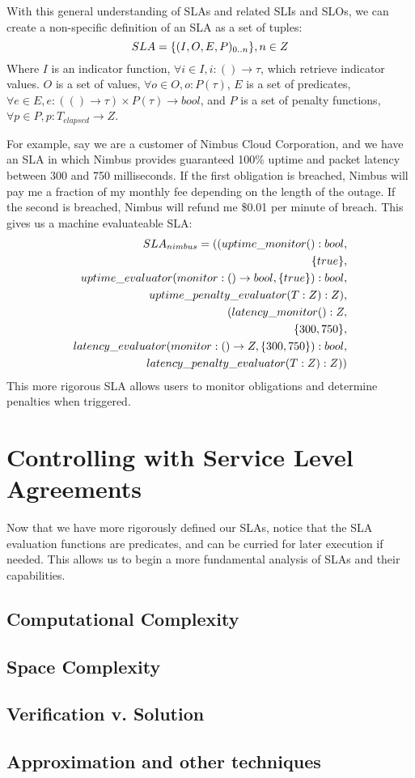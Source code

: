With this general understanding of SLAs and related SLIs and SLOs, we can create a non-specific definition of an SLA as a set of tuples:
\begin{equation}
SLA = \lbrace (I,O,E,P)_{0..n} \rbrace, n \in Z \\
\end{equation}
Where $ I $ is an indicator function, $ \forall i \in I, i : () \rightarrow \tau $, which retrieve indicator values.  $ O $ is a set of values, $ \forall o \in O, o : P(\tau) $, $ E $ is a set of predicates, $ \forall e \in E, e : ( () \rightarrow \tau ) \times P(\tau) \rightarrow bool $, and $ P $ is a set of penalty functions, $ \forall p \in P, p : T_{elapsed} \rightarrow Z $.

For example, say we are a customer of Nimbus Cloud Corporation, and we have an SLA in which Nimbus provides guaranteed 100\% uptime and packet latency between 300 and 750 milliseconds.  If the first obligation is breached, Nimbus will pay me a fraction of my monthly fee depending on the length of the outage.  If the second is breached, Nimbus will refund me \$0.01 per minute of breach.  This gives us a machine evaluateable SLA:
\begin{align}
SLA_{nimbus} = ( ( uptime\_monitor() : bool, \\
\lbrace true \rbrace, \notag \\
uptime\_evaluator( monitor : () \rightarrow bool, \lbrace true \rbrace) : bool, \notag \\
uptime\_penalty\_evaluator( T : Z ) : Z ), \notag \\
( latency\_monitor() : Z, \notag \\
\lbrace 300, 750 \rbrace, \notag \\
latency\_evaluator( monitor : () \rightarrow Z, \lbrace 300, 750 \rbrace) : bool, \notag \\
latency\_penalty\_evaluator( T : Z ) : Z) ) \notag
\end{align}
This more rigorous SLA allows users to monitor obligations and determine penalties when triggered.

\section{Controlling with Service Level Agreements}
Now that we have more rigorously defined our SLAs, notice that the SLA evaluation functions are predicates, and can be curried for later execution if needed.  This allows us to begin a more fundamental analysis of SLAs and their capabilities.

\subsection{Computational Complexity}


\subsection{Space Complexity}

\subsection{Verification v. Solution}

\subsection{Approximation and other techniques}





